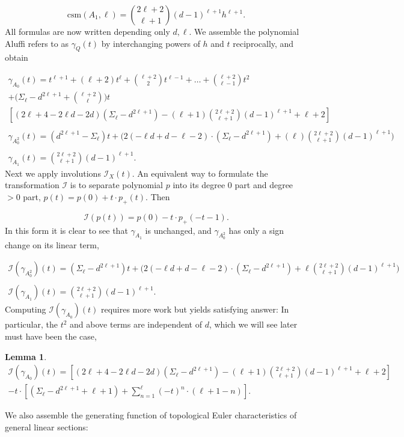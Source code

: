 \documentclass[11pt]{article}
\theoremstyle{plain}
\newtheorem{lemma}[fact]{Lemma}
\theoremstyle{definition}
\theoremstyle{definition}
\begin{document}
\[
\text{csm}(A_1,\ell)= {2\ell+2\choose \ell+1}(d-1)^{\ell+1}h^{\ell+1}.
\]
All formulas are now written depending only $d,\ell$. We assemble the polynomial Aluffi refers to as $\gamma_{Q}(t)$ by interchanging powers of $h$ and $t$ reciprocally, and obtain 

\begin{gather*}
\gamma_{A_0}(t) = t^{\ell+1} + (\ell+2)t^\ell + {\ell+2\choose 2}t^{\ell-1} + \dots + {\ell+2\choose \ell-1}t^2\\
+ \Big(\Sigma_\ell-d^{2\ell+1}+{\ell+2\choose \ell}\Big)t\\
\left[(2\ell+4-2\ell d-2d)(\Sigma_\ell-d^{2\ell+1})-(\ell+1){2\ell+2\choose \ell+1}(d-1)^{\ell+1}+\ell+2\right]\\\\
 \gamma_{A_0^2}(t) = (d^{2\ell+1}-\Sigma_\ell)t + \Big(2(-\ell d+d-\ell-2)\cdot (\Sigma_\ell-d^{2\ell+1})+(\ell){2\ell+2\choose \ell+1}(d-1)^{\ell+1}\Big)\\\\
 \gamma_{A_1}(t)={2\ell+2\choose \ell+1}(d-1)^{\ell+1}.
\end{gather*}
Next we apply involutions $\mathscr I_X(t)$. An equivalent way to formulate the transformation $\mathscr I$ is to separate polynomial $p$ into its degree 0 part and degree $>0$ part, $p(t) = p(0)+t\cdot p_+(t)$. Then 

\[
\mathscr I(p(t)) = p(0) - t\cdot p_+(-t-1).
\]
In this form it is clear to see that $\gamma_{A_1}$ is unchanged, and $\gamma_{A_0^2}$ has only a sign change on its linear term,

\begin{gather*}
\mathscr I(\gamma_{A_0^2})(t) =  (\Sigma_\ell-d^{2\ell+1})t + \Big(2(-\ell d+d-\ell-2)\cdot (\Sigma_\ell-d^{2\ell+1})+\ell{2\ell+2\choose \ell+1}(d-1)^{\ell+1}\Big)\\\\
\mathscr I(\gamma_{A_1})(t) ={2\ell+2\choose \ell+1}(d-1)^{\ell+1}.
\end{gather*}
Computing $\mathscr I(\gamma_{A_0})(t)$ requires more work but yields satisfying answer: In particular, the $t^2$ and above terms are independent of $d$, which we will see later must have been the case,

\begin{lemma}
\begin{gather*}
\mathscr I(\gamma_{A_0})(t) = \left[(2\ell+4-2\ell d-2d)(\Sigma_\ell-d^{2\ell+1})-(\ell+1){2\ell+2\choose \ell+1}(d-1)^{\ell+1}+\ell+2\right]\\
-t\cdot \left[\left(\Sigma_\ell-d^{2\ell+1}+\ell+1\right) + \sum_{n=1}^\ell (-t)^n\cdot(\ell+1-n)\right].
\end{gather*}
\end{lemma}
We also assemble the generating function of topological Euler characteristics of general linear sections:
\end{document}
